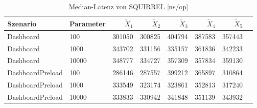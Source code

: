 
\begin{table}[ht]
\setlength{\extrarowheight}{-1pt}
\centering
\caption{Median-Latenz von SQUIRREL [ns/op]}
\begin{tabular}{llrrrrrr}
\toprule
Szenario & Parameter & ${\tilde{X}_1}$ & ${\tilde{X}_2}$ & ${\tilde{X}_3}$ & ${\tilde{X}_4}$ & ${\tilde{X}_5}$ \\
\midrule
	Dashboard & 100 & 301050 & 300825 & 404794 & 387583 & 357443 \\
	Dashboard & 1000 & 343702 & 331156 & 335157 & 361836 & 342233 \\
	Dashboard & 10000 & 348777 & 334727 & 357309 & 357834 & 359130 \\
	DashboardPreload & 100 & 286146 & 287557 & 399212 & 365897 & 310864 \\
	DashboardPreload & 1000 & 333549 & 323174 & 323861 & 352813 & 317240 \\
	DashboardPreload & 10000 & 333833 & 330942 & 341848 & 351139 & 343932 \\
\bottomrule
\end{tabular}
\label{tab:durchsatz_squirrel}
\end{table}
	